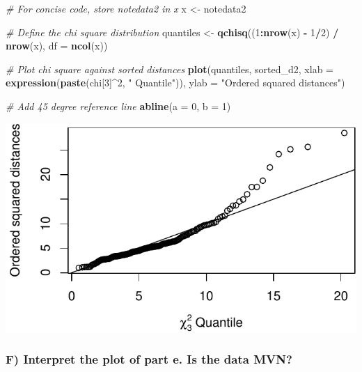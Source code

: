 \documentclass[
]{article}
\newenvironment{Shaded}{\begin{snugshade}}{\end{snugshade}}
\newcommand{\CommentTok}[1]{\textcolor[rgb]{0.56,0.35,0.01}{\textit{#1}}}
\newcommand{\DataTypeTok}[1]{\textcolor[rgb]{0.13,0.29,0.53}{#1}}
\newcommand{\DecValTok}[1]{\textcolor[rgb]{0.00,0.00,0.81}{#1}}
\newcommand{\KeywordTok}[1]{\textcolor[rgb]{0.13,0.29,0.53}{\textbf{#1}}}
\newcommand{\NormalTok}[1]{#1}
\newcommand{\OperatorTok}[1]{\textcolor[rgb]{0.81,0.36,0.00}{\textbf{#1}}}
\newcommand{\StringTok}[1]{\textcolor[rgb]{0.31,0.60,0.02}{#1}}
\begin{document}
\begin{Shaded}
\begin{Highlighting}[]
\CommentTok{# For concise code, store notedata2 in x }
\NormalTok{x <-}\StringTok{ }\NormalTok{notedata2}

\CommentTok{# Define the chi square distribution}
\NormalTok{quantiles <-}\StringTok{ }\KeywordTok{qchisq}\NormalTok{((}\DecValTok{1}\OperatorTok{:}\KeywordTok{nrow}\NormalTok{(x) }\OperatorTok{-}\StringTok{ }\DecValTok{1}\OperatorTok{/}\DecValTok{2}\NormalTok{) }\OperatorTok{/}\StringTok{ }\KeywordTok{nrow}\NormalTok{(x), }\DataTypeTok{df =} \KeywordTok{ncol}\NormalTok{(x))}

\CommentTok{# Plot chi square against sorted distances}
\KeywordTok{plot}\NormalTok{(quantiles, sorted_d2,}
\DataTypeTok{xlab =} \KeywordTok{expression}\NormalTok{(}\KeywordTok{paste}\NormalTok{(chi[}\DecValTok{3}\NormalTok{]}\OperatorTok{^}\DecValTok{2}\NormalTok{, }\StringTok{" Quantile"}\NormalTok{)), }\DataTypeTok{ylab =} \StringTok{"Ordered squared distances"}\NormalTok{)}

\CommentTok{# Add 45 degree reference line }
\KeywordTok{abline}\NormalTok{(}\DataTypeTok{a =} \DecValTok{0}\NormalTok{, }\DataTypeTok{b =} \DecValTok{1}\NormalTok{)}
\end{Highlighting}
\end{Shaded}

\begin{center}\includegraphics{2.0-Multivariate-Visualization-Assignment_files/figure-latex/unnamed-chunk-23-1} \end{center}

\hypertarget{f-interpret-the-plot-of-part-e.-is-the-data-mvn}{%
\subsubsection{F) Interpret the plot of part e. Is the data
MVN?}\label{f-interpret-the-plot-of-part-e.-is-the-data-mvn}}
\end{document}
